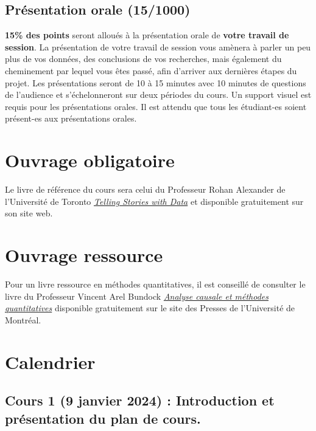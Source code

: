 \documentclass[
  letterpaper,
  DIV=11,
  numbers=noendperiod]{scrartcl}
\begin{document}
\subsection{Présentation orale
(15/1000)}\label{pruxe9sentation-orale-151000}

\textbf{15\% des points} seront alloués à la présentation orale de
\textbf{votre travail de session}. La présentation de votre travail de
session vous amènera à parler un peu plus de vos données, des
conclusions de vos recherches, mais également du cheminement par lequel
vous êtes passé, afin d'arriver aux dernières étapes du projet. Les
présentations seront de 10 à 15 minutes avec 10 minutes de questions de
l'audience et s'échelonneront sur deux périodes du cours. Un support
visuel est requis pour les présentations orales. Il est attendu que tous
les étudiant-es soient présent-es aux présentations orales.

\section{Ouvrage obligatoire}\label{ouvrage-obligatoire}

Le livre de référence du cours sera celui du Professeur Rohan Alexander
de l'Université de Toronto
\href{https://tellingstorieswithdata.com/}{\emph{Telling Stories with
Data}} et disponible gratuitement sur son site web.

\section{Ouvrage ressource}\label{ouvrage-ressource}

Pour un livre ressource en méthodes quantitatives, il est conseillé de
consulter le livre du Professeur Vincent Arel Bundock
\href{https://pum.umontreal.ca/catalogue/analyse_causale_et_methodes_quantitatives}{\emph{Analyse
causale et méthodes quantitatives}} disponible gratuitement sur le site
des Presses de l'Université de Montréal.

\section{Calendrier}\label{calendrier}

\subsection{Cours 1 (9 janvier 2024) : Introduction et présentation du
plan de
cours.}\label{cours-1-9-janvier-2024-introduction-et-pruxe9sentation-du-plan-de-cours.}
\end{document}
